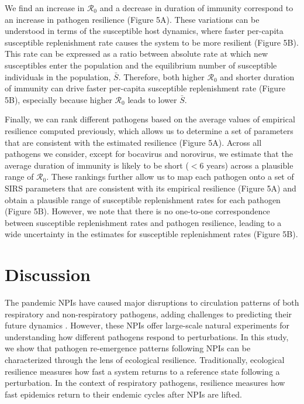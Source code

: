 \documentclass[12pt]{article}
\begin{document}
We find an increase in $\mathcal R_0$ and a decrease in duration of immunity correspond to an increase in pathogen resilience (Figure 5A).
These variations can be understood in terms of the susceptible host dynamics, where faster per-capita susceptible replenishment rate causes the system to be more resilient (Figure 5B).
This rate can be expressed as a ratio between absolute rate at which new susceptibles enter the population and the equilibrium number of susceptible individuals in the population, $\bar{S}$.
Therefore, both higher $\mathcal R_0$ and shorter duration of immunity can drive faster per-capita susceptible replenishment rate (Figure 5B), especially because higher $\mathcal R_0$ leads to lower $\bar{S}$.

Finally, we can rank different pathogens based on the average values of empirical resilience computed previously, which allows us to determine a set of parameters that are consistent with the estimated resilience (Figure 5A).
Across all pathogens we consider, except for bocavirus and norovirus, we estimate that the average duration of immunity is likely to be short ($<6$ years) across a plausible range of $\mathcal R_0$.
These rankings further allow us to map each pathogen onto a set of SIRS parameters that are consistent with its empirical resilience (Figure 5A) and obtain a plausible range of susceptible replenishment rates for each pathogen (Figure 5B).
However, we note that there is no one-to-one correspondence between susceptible replenishment rates and pathogen resilience, leading to a wide uncertainty in the estimates for susceptible replenishment rates (Figure 5B).

\section*{Discussion}

The pandemic NPIs have caused major disruptions to circulation patterns of both respiratory and non-respiratory pathogens, adding challenges to predicting their future dynamics \citep{baker2020impact,gomez2021uncertain,koltai2022determinants,park2024predicting}.
However, these NPIs offer large-scale natural experiments for understanding how different pathogens respond to perturbations.
In this study, we show that pathogen re-emergence patterns following NPIs can be characterized through the lens of ecological resilience.
Traditionally, ecological resilience measures how fast a system returns to a reference state following a perturbation.
In the context of respiratory pathogens, resilience measures how fast epidemics return to their endemic cycles after NPIs are lifted.
\end{document}
